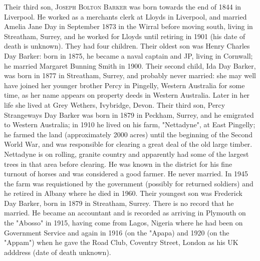 Their third son, \textsc{Joseph Bolton Barker} was born towards the end of 1844 in Liverpool. He worked as a merchants clerk at Lloyds in Liverpool, and married Amelia Jane Day in September 1873 in the Wirral before moving south, living in Streatham, Surrey, and he worked for Lloyds until retiring in 1901 (his date of death is unknown). They had four children. Their oldest son was Henry Charles Day Barker: born in 1875, he became a naval captain and JP, living in Cornwall; he married Margaret Bunning Smith in 1900. Their second child, Ida Day Barker,  was born in 1877 in Streatham, Surrey, and probably never married: she may well have joined her younger brother Percy in Pingelly, Western Australia for some time, as her name appears on property deeds in Western Australia. Later in her life she lived at Grey Wethers, Ivybridge, Devon. Their third son, Percy Strangeways Day Barker was born in 1879 in Peckham, Surrey, and he emigrated to Western Australia; in 1910 he lived  on his farm, "Nettadyne", at East Pingelly; he farmed the land (approximately 2000 acres) until the beginning of the Second World War, and was responsible for clearing a great deal of the old large timber. Nettadyne is on rolling, granite country and apparently had some of the largest trees in that area before clearing. He was known in the district for his fine turnout of horses and was considered a good farmer. He never married. In 1945 the farm was requistioned by the government (possibly for returned soldiers) and he retired in Albany where he died in 1960. Their youngest son was Frederick Day Barker, born in 1879 in	Streatham, Surrey. There is no record that he married. He became an accountant and is recorded as arriving in Plymouth on the "Abosso" in 1915, having come from Lagos, Nigeria where he had been on Government Service and again in 1916 (on the "Apapa) and 1920 (on the "Appam") when he gave the Road Club, Coventry Street, London as his UK adddress (date of death unknown).



